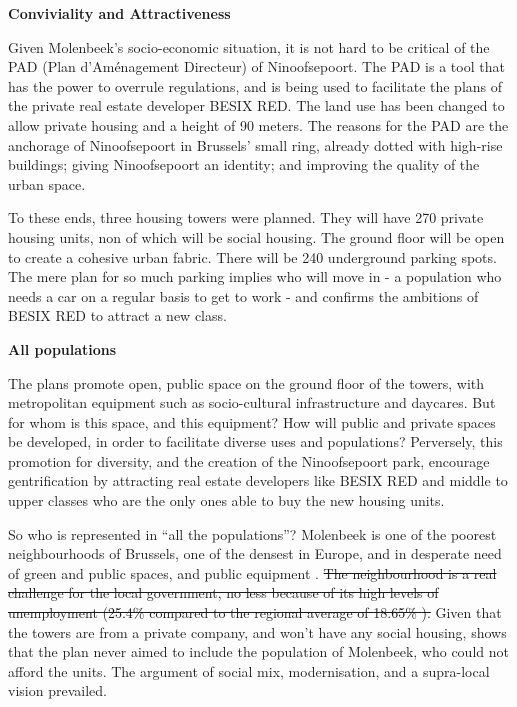 \documentclass{article}[11pt]
\begin{document}
\textbf{Conviviality and Attractiveness}

Given Molenbeek's socio-economic situation, it is not hard to be critical of the PAD (Plan d'Aménagement Directeur) of Ninoofsepoort. The PAD is a tool that has the power to overrule regulations, and is being used to facilitate the plans of the private real estate developer BESIX RED. The land use has been changed to allow private housing and a height of 90 meters. The reasons for the PAD are the anchorage of Ninoofsepoort in Brussels' small ring, already dotted with high-rise buildings; giving Ninoofsepoort an identity; and improving
the quality of the urban space.

To these ends, three housing towers were planned. They will have 270 private housing units, non of which will be social housing. The ground floor will be open to create a cohesive urban fabric. There will be 240 underground parking spots. The mere plan for so much parking implies who will move in - a population who needs a car on a regular basis to get to work - and confirms the ambitions of BESIX RED to attract a new class. 

\textbf{All populations}

The plans promote open, public space on the ground floor of the towers, with metropolitan equipment such as socio-cultural infrastructure and daycares. But for whom is this space, and this equipment? How will public and private spaces be developed, in order to facilitate diverse uses and populations? Perversely, this promotion for diversity, and the creation of the Ninoofsepoort park, encourage gentrification by attracting real estate developers like BESIX RED and middle to upper classes who are the only ones able to buy the new housing units.

So who is represented in ``all the populations''? Molenbeek is one of the poorest neighbourhoods of Brussels, one of the densest in Europe, and in desperate need of green and public spaces, and public equipment \parencite{ieb2019ninove}. \sout{The neighbourhood is a real challenge for the local government, no less because of its high levels of unemployment (25.4\% compared to the regional average of 18.65\% \parencite{monitoring2018chomage}).} Given that the towers are from a private company, and won't have any social housing, shows that the plan never aimed to include the population of Molenbeek, who could not afford the units. The argument of social mix, modernisation, and a supra-local vision prevailed.
\end{document}
